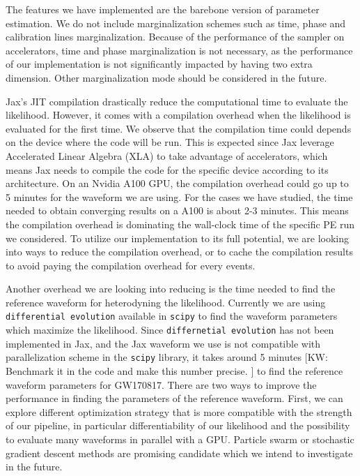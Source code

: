 \documentclass[twocolumn]{aastex631}
\newcommand{\kw}[1]{{\color{rb4}[KW: #1 ]}}
\begin{document}

The features we have implemented are the barebone version of parameter
estimation. We do not include marginalization schemes such as time, phase and
calibration lines marginalization. Because of the performance of the sampler on
accelerators, time and phase marginalization is not necessary, as the
performance of our implementation is not significantly impacted by having two
extra dimension. Other marginalization mode should be considered in the future.

Jax's JIT compilation drastically reduce the computational time to evaluate the
likelihood. However, it comes with a compilation overhead when the likelihood is
evaluated for the first time. We observe that the compilation time could depends
on the device where the code will be run. This is expected since Jax leverage
Accelerated Linear Algebra (XLA) to take advantage of accelerators, which means
Jax needs to compile the code for the specific device according to its
architecture. On an Nvidia A100 GPU, the compilation overhead could go up to 5
minutes for the waveform we are using. For the cases we have studied, the time
needed to obtain converging results on a A100 is about 2-3 minutes. This means
the compilation overhead is dominating the wall-clock time of the specific PE
run we considered. To utilize our implementation to its full potential, we are
looking into ways to reduce the compilation overhead, or to cache the
compilation results to avoid paying the compilation overhead for every events.


Another overhead we are looking into reducing is the time needed to find the
reference waveform for heterodyning the likelihood. Currently we are using
\texttt{differential evolution} available in \texttt{scipy} to find the waveform
parameters which maximize the likelihood. Since \texttt{differnetial evolution}
has not been implemented in Jax, and the Jax waveform we use is not compatible
with parallelization scheme in the \texttt{scipy} library, it takes around 5
minutes \kw{Benchmark it in the code and make this number precise.} to find the
reference waveform parameters for GW170817. There are two ways to improve the
performance in finding the parameters of the reference waveform. First, we can
explore different optimization strategy that is more compatible with the
strength of our pipeline, in particular differentiability of our likelihood and
the possibility to evaluate many waveforms in parallel with a GPU. Particle
swarm or stochastic gradient descent methods are promising candidate which we
intend to investigate in the future. 
\end{document}
